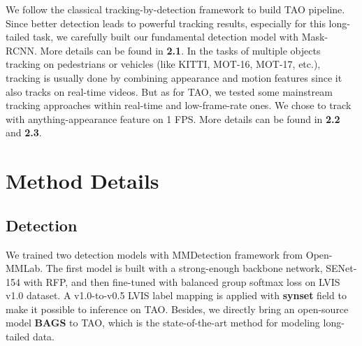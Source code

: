 \documentclass[runningheads]{llncs}
\begin{document}
We follow the classical tracking-by-detection framework to build TAO pipeline. Since better detection leads to powerful tracking results, especially for this long-tailed task, we carefully built our fundamental detection model with Mask-RCNN. More details can be found in \textbf{2.1}.
In the tasks of multiple objects tracking on pedestrians or vehicles (like KITTI, MOT-16, MOT-17, etc.), tracking is usually done by combining appearance and motion features since it also tracks on real-time videos. But as for TAO, we tested some mainstream tracking approaches within real-time and low-frame-rate ones. We chose to track with anything-appearance feature on 1 FPS. More details can be found in \textbf{2.2} and \textbf{2.3}.

\section{Method Details}
\subsection{Detection}
We trained two detection models with MMDetection\cite{mmdetection} framework from Open-MMLab. The first model is built with a strong-enough backbone network, SENet-154 with RFP, and then fine-tuned with balanced group softmax loss on LVIS\cite{gupta2019lvis} v1.0 dataset. A v1.0-to-v0.5 LVIS label mapping is applied with \textbf{synset} field to make it possible to inference on TAO. Besides, we directly bring an open-source model \textbf{BAGS} to TAO, which is the state-of-the-art method for modeling long-tailed data.
\end{document}
